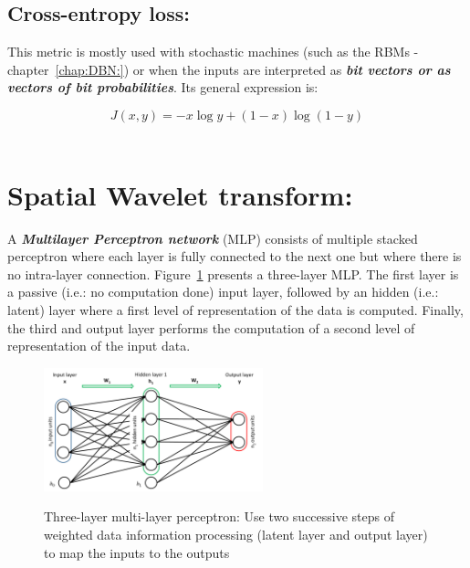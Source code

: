 \documentclass[a4paper,11pt]{report}
\newcommand{\Important}[1]{\textbf{{\em #1}}}
\begin{document}
		\subsection{Cross-entropy loss:}
			This metric is mostly used with stochastic machines (such as the RBMs - chapter~\ref{chap:DBN:}) or when the inputs are interpreted as \Important{bit vectors  or as vectors of bit probabilities}. Its general expression is:
			
			\begin{equation}
				J(x,y) = - x \log y + (1 - x)\log(1 - y)
				\label{eq:Cross-entropy}
			\end{equation}\\
          
	\section{Spatial Wavelet transform:}
		\label{seq:Artificial neural networks/Multilayer perceptron network}
		
		A \Important{Multilayer Perceptron network} (MLP) consists of multiple stacked perceptron where each layer is fully connected to the next one but where there is no intra-layer connection. Figure~\ref{fig:The multi-layers perceptron network} presents a three-layer MLP. The first layer is a passive (i.e.: no computation done) input layer, followed by an hidden (i.e.: latent) layer where a first level of representation of the data is computed. Finally, the third and output layer performs the computation of a second level of representation of the input data. 
		
		\begin{figure}[H]
			\begin{center}
				\caption[A Multi-layers perceptron network]{Three-layer multi-layer perceptron: Use two successive steps of weighted data information processing (latent layer and output layer) to map the  inputs to the outputs}
				\includegraphics[width=2.5in]{Images/NN/MLP.pdf}
				\label{fig:The multi-layers perceptron network}
			\end{center}
		\end{figure}
       
\end{document}
